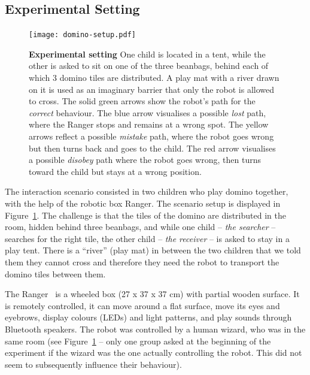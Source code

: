 \documentclass[letterpaper, 10pt, conference]{ieeeconf}
\begin{document}
\subsection{Experimental Setting}

\begin{figure}[ht!] 
    \centering 
    \texttt{[image: domino-setup.pdf]} 
    \caption{\small \textbf{Experimental setting} One child is located in a
        tent, while the other is asked to sit on one of the three beanbags,
        behind each of which 3 domino tiles are distributed. A play mat with a
        river drawn on it is used as an imaginary barrier that only the robot is
        allowed to cross. The solid green arrows show the robot's path for the
        \textit{correct} behaviour. The blue arrow visualises a possible
        \textit{lost} path, where the Ranger stops and remains at a wrong spot.
        The yellow arrows reflect a possible \textit{mistake} path, where the
        robot goes wrong but then turns back and goes to the child. The red
        arrow visualises a possible \textit{disobey} path where the robot goes
        wrong, then turns toward the child but stays at a wrong position.} 

    \label{fig:domino-setup} 
\end{figure}


The interaction scenario consisted in two children who play domino together,
with the help of the robotic box Ranger. The scenario setup is displayed in
Figure~\ref{fig:domino-setup}. The challenge is that the tiles of the domino are
distributed in the room, hidden behind three beanbags, and while one child --
\textit{the searcher} -- searches for the right tile, the other child --
\textit{the receiver} -- is asked to stay in a play tent. There is a ``river''
(play mat) in between the two children that we told them they cannot cross
and therefore they need the robot to transport the domino tiles between them.

The Ranger~\cite{mondada2014ranger} is a wheeled box (27 x 37 x 37 cm) with
partial wooden surface. It is remotely controlled, it can move around a flat
surface, move its eyes and eyebrows, display colours (LEDs) and light patterns,
and play sounds through Bluetooth speakers.  The robot was controlled by a human
wizard, who was in the same room (see Figure~\ref{fig:domino-setup} -- only one
group asked at the beginning of the experiment if the wizard was the one
actually controlling the robot. This did not seem to subsequently influence
their behaviour).
\end{document}
